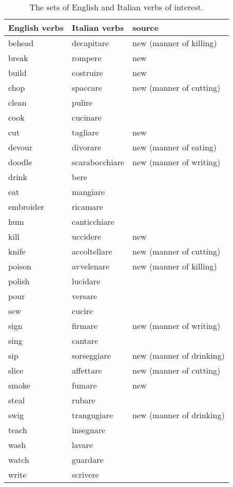\begin{table}[htb] %
\caption{The sets of English and Italian verbs of interest.}
\begin{tabular}{ll|l}
\textbf{English verbs} & \textbf{Italian verbs} & \textbf{source} \\
\hline
behead	&	decapitare & new (manner of killing)	\\
break	&	rompere & new	\\
build	&	costruire & new\\	
chop	&	spaccare & new (manner of cutting)	\\
clean	&	pulire & \textcite{Levin1993}	\\
cook	&	cucinare & \textcite{Levin1993}	\\
cut	&	tagliare & new	\\
devour	&	divorare & new (manner of eating)	\\
doodle	&	scarabocchiare & new (manner of writing)\\	
drink	&	bere & \textcite{Levin1993, Resnik1993}	\\
eat	&	mangiare & \textcite{Levin1993, Resnik1993}	\\
embroider	&	ricamare & \textcite{Levin1993}	\\
hum	&	canticchiare & \textcite{Levin1993}	\\
kill	&	uccidere & new	\\
knife	&	accoltellare & new (manner of cutting)	\\
poison	&	avvelenare & new (manner of killing)	\\
polish	&	lucidare & \textcite{Levin1993}	\\
pour	&	versare & \textcite{Resnik1993}	\\
sew	&	cucire & \textcite{Levin1993}	\\
sign	&	firmare & new (manner of writing)	\\
sing	&	cantare & \textcite{Levin1993, Resnik1993}	\\
sip	&	sorseggiare & new (manner of drinking)	\\
slice	&	affettare & new (manner of cutting)\\	
smoke	&	fumare & new	\\
steal	&	rubare & \textcite{Resnik1993}	\\
swig	&	trangugiare & new (manner of drinking)	\\
teach	&	insegnare & \textcite{Levin1993}	\\
wash	&	lavare & \textcite{Levin1993}	\\
watch	&	guardare & \textcite{Resnik1993}	\\
write	&	scrivere & \textcite{Levin1993, Resnik1993}	       
\end{tabular}
\end{table}


